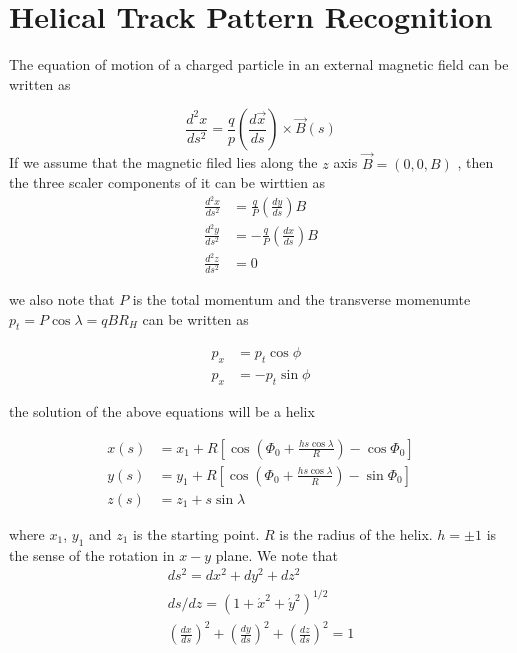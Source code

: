 \section{Helical Track Pattern Recognition}
\label{App:SciFiHelicalTrackPatternRecognition}
The equation of motion of a charged particle in an external magnetic field
can be written as

\begin{equation}
\frac{d^2 x}{ds^2}=\frac{q}{p}(\frac{d \vec{x}}{ds})\times \vec{B}(s)
\end{equation}
If we assume that the magnetic filed lies along the $z$ axis $\vec{B}=(0,0,B)$
, then the three scaler components of it can be wirttien as
\begin{equation}
\begin{split}
\frac{d^2 x}{ds^2} &=\frac{q}{P}(\frac{dy}{ds})B\\
\frac{d^2 y}{ds^2} &=-\frac{q}{P}(\frac{dx}{ds})B\\
\frac{d^2 z}{ds^2} &=0
\end{split}
\end{equation}

we also note that $P$ is the total momentum and the transverse
momenumte $p_t =P \cos \lambda=qBR_H$
can be written as

\begin{equation}
\begin{split}
p_x &=p_t \cos \phi\\
p_x &=-p_t \sin \phi
\end{split}
\end{equation}

the solution of the above equations will be a helix

\begin{equation}
\begin{split}
x(s) &=x_{1} + R \left[\cos \left(\Phi_{0}+\frac{hs\cos \lambda}{R} \right)-\cos \Phi_{0} \right]\\
y(s) &=y_{1} + R \left[\cos \left(\Phi_{0}+\frac{hs\cos \lambda}{R} \right)-\sin \Phi_{0} \right]\\
z(s) &=z_{1}+s \sin \lambda
\end{split}
\end{equation}

where $x_{1}$, $y_{1}$ and $z_{1}$ is the starting point. $R$ is the radius of the helix.
$h=\pm 1$ is the sense of the rotation in $x-y$ plane. We note that
\begin{equation}
 \begin{split}
ds^2 =dx^2+dy^2+dz^2\\
ds/dz =(1+\acute{x}^2+\acute{y}^2)^{1/2}\\
(\frac{dx}{ds})^2 +(\frac{dy}{ds})^2 + (\frac{dz}{ds})^2 = 1
\end{split}
\end{equation}

